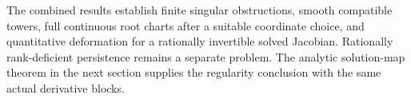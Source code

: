 The combined results establish finite singular obstructions, smooth
compatible towers, full continuous root charts after a suitable coordinate
choice, and quantitative deformation for a rationally invertible solved
Jacobian. Rationally rank-deficient persistence remains a separate problem.
The analytic solution-map theorem in the next section supplies the
regularity conclusion with the same actual derivative blocks.
